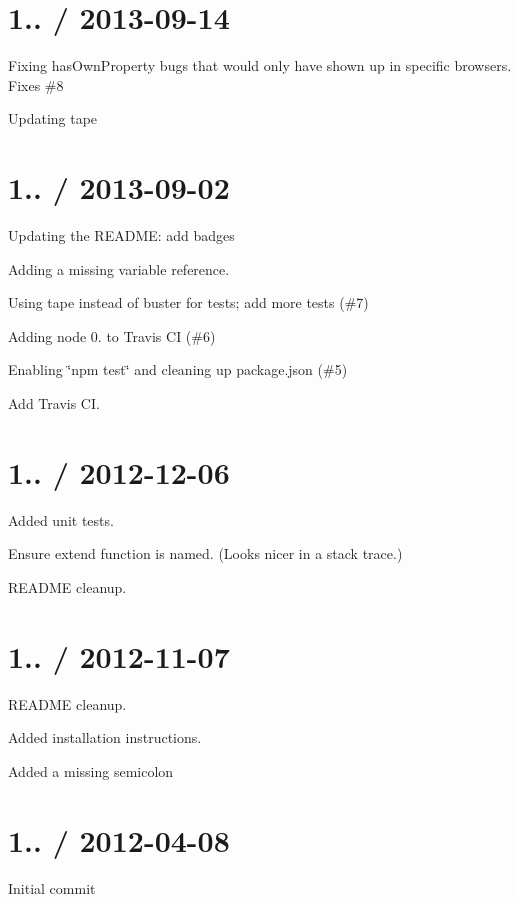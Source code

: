 \section*{1.. / 2013-\/09-\/14 }


\begin{DoxyItemize}
\item Fixing has\+Own\+Property bugs that would only have shown up in specific browsers. Fixes \#8
\item Updating {\ttfamily tape}
\end{DoxyItemize}

\section*{1.. / 2013-\/09-\/02 }


\begin{DoxyItemize}
\item Updating the R\+E\+A\+D\+ME\+: add badges
\item Adding a missing variable reference.
\item Using {\ttfamily tape} instead of {\ttfamily buster} for tests; add more tests (\#7)
\item Adding node 0. to Travis CI (\#6)
\item Enabling \char`\"{}npm test\char`\"{} and cleaning up package.\+json (\#5)
\item Add Travis CI.
\end{DoxyItemize}

\section*{1.. / 2012-\/12-\/06 }


\begin{DoxyItemize}
\item Added unit tests.
\item Ensure extend function is named. (Looks nicer in a stack trace.)
\item R\+E\+A\+D\+ME cleanup.
\end{DoxyItemize}

\section*{1.. / 2012-\/11-\/07 }


\begin{DoxyItemize}
\item R\+E\+A\+D\+ME cleanup.
\item Added installation instructions.
\item Added a missing semicolon
\end{DoxyItemize}

\section*{1.. / 2012-\/04-\/08 }


\begin{DoxyItemize}
\item Initial commit 
\end{DoxyItemize}